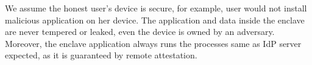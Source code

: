 We assume the honest user's device is secure, for example, user would not install malicious application on her device.
The application and data inside the enclave are never tempered or leaked, even %
the device is owned by an adversary.
Moreover, the enclave application always runs the processes same as IdP server expected, as it is guaranteed by remote attestation.



